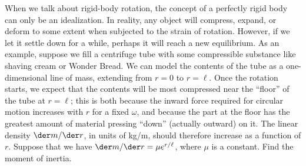 When we talk about rigid-body rotation, the concept of a perfectly rigid body can only be
an idealization. In reality, any object will compress, expand, or deform to some extent when
subjected to the strain of rotation. However, if we let it settle down for a while, perhaps
it will reach a new equilibrium. As an example, suppose we fill a centrifuge tube with some
compressible substance like shaving cream or Wonder Bread. We can model the contents of the
tube as a one-dimensional line of mass, extending from $r=0$ to $r=\ell$. Once the rotation starts,
we expect that the contents will be most compressed near the ``floor'' of the tube at $r=\ell$; this
is both because the inward force required for circular motion increases with $r$ for a fixed $\omega$,
and because the part at the floor has the greatest amount of material pressing ``down'' (actually
outward) on it. The linear density $\der m/\der r$, in units of kg/m, should therefore increase
as a function of $r$. Suppose that we have $\der m/\der r=\mu e^{r/\ell}$, where $\mu$ is a constant.
Find the moment of inertia.\answercheck

